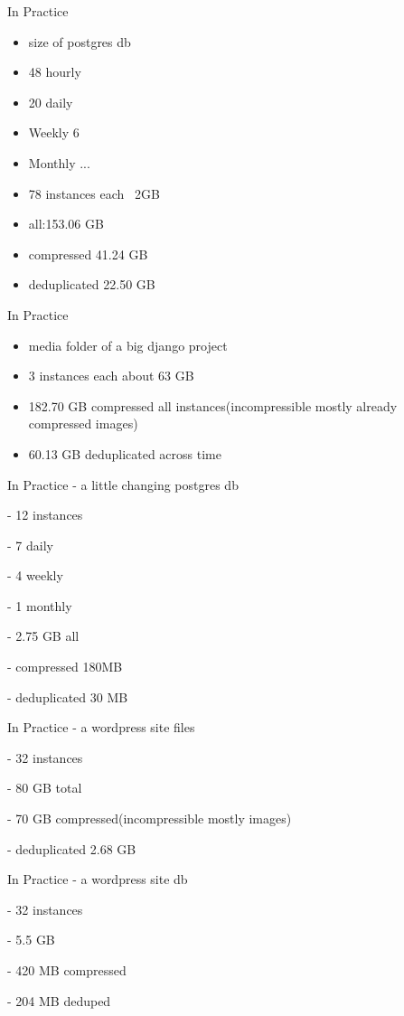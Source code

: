 \documentclass{beamer}
\begin{document}
\begin{frame}{In Practice}
	\begin{itemize}
		\item size of postgres db 
		\item 48 hourly
		\item 20 daily 
		\item Weekly 6
		\item Monthly ...
		\item 78 instances  each ~2GB
		\item all:153.06 GB
		\item compressed 41.24 GB
		\item deduplicated 22.50 GB
	\end{itemize}
\end{frame}
\begin{frame}{In Practice}
\begin{itemize}
	\item media folder of a big django project 
	\item 3 instances each about 63 GB
	\item 182.70 GB compressed all instances(incompressible mostly already compressed images)
	\item 60.13 GB deduplicated across time
\end{itemize}
\end{frame}

\begin{frame}{In Practice}
	- a little changing postgres db 
	
	- 12 instances
	
	- 7 daily 
	
	- 4 weekly 
	
	- 1 monthly 
	
	- 2.75 GB all 
	
	- compressed 180MB
	
	- deduplicated 30 MB
\end{frame}

\begin{frame}{In Practice}
	- a wordpress site files  
	
	- 32 instances   
	
	- 80 GB total   
	
	- 70 GB compressed(incompressible mostly images)  
	
	- deduplicated 2.68 GB
	
\end{frame}

\begin{frame}{In Practice}
	- a wordpress site db
	
	- 32 instances
	
	- 5.5 GB
	
	- 420 MB compressed
	
	- 204 MB deduped
\end{frame}
\end{document}
